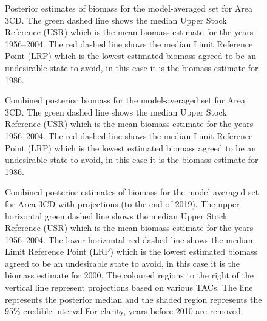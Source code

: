 \documentclass[11pt]{book}
\begin{document}
\begin{figure}[htb]

{\centering {} 

}

\caption{Posterior estimates of biomass for the model-averaged set for Area 3CD. The green dashed line shows the median Upper Stock Reference (USR) which is the mean biomass estimate for the years 1956--2004. The red dashed line shows the median Limit Reference Point (LRP) which is the lowest estimated biomass agreed to be an undesirable state to avoid, in this case it is the biomass estimate for 1986.}\label{fig:summary-fig-model-average-biomass-comp-3cd}
\end{figure}
\clearpage
\begin{figure}[htb]

{\centering {} 

}

\caption{Combined posterior biomass for the model-averaged set for Area 3CD.  The green dashed line shows the median Upper Stock Reference (USR) which is the mean biomass estimate for the years 1956--2004. The red dashed line shows the median Limit Reference Point (LRP) which is the lowest estimated biomass agreed to be an undesirable state to avoid, in this case it is the biomass estimate for 1986.}\label{fig:summary-fig-model-average-biomass-3cd}
\end{figure}
\clearpage
\begin{figure}[htb]

{\centering {} 

}

\caption{Combined posterior estimates of biomass for the model-averaged set for Area 3CD with projections (to the end of 2019).  The upper horizontal green dashed line shows the median Upper Stock Reference (USR) which is the mean biomass estimate for the years 1956--2004. The lower horizontal red dashed line shows the median Limit Reference Point (LRP) which is the lowest estimated biomass agreed to be an undesirable state to avoid, in this case it is the biomass estimate for 2000. The coloured regions to the right of the vertical line represent projections based on various TACs. The line represents the posterior median and the shaded region represents the 95\% credible interval.For clarity, years before 2010 are removed.}\label{fig:summary-fig-model-average-biomass-3cd-proj}
\end{figure}
\end{document}
